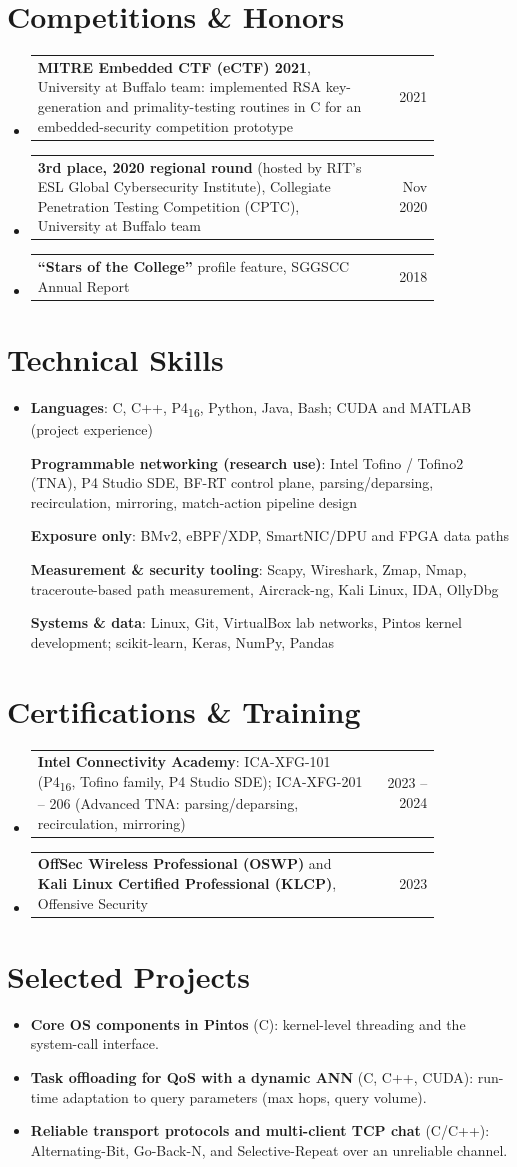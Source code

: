 \documentclass[letterpaper,10pt]{article}
\makeatletter
\newcommand{\cvsection}[2][5]{\Needspace{#1\baselineskip}\section{#2}}
\newcommand{\entryline}[2]{%
  \item\begin{tabular*}{\linewidth}{@{}p{0.84\linewidth}@{\extracolsep{\fill}}r@{}}
    \leavevmode #1 & \small #2\\
  \end{tabular*}\vspace{-3pt}}
\newenvironment{entries}{\begin{itemize}[leftmargin=0pt,label={},itemsep=2pt,topsep=0pt,parsep=0pt]}{\end{itemize}}
\newcommand{\skill}[2]{\textbf{#1}: #2\par\vspace{1.5pt}}
\makeatother
\begin{document}
\cvsection[6]{Competitions \& Honors}
\begin{entries}
  \entryline{\textbf{MITRE Embedded CTF (eCTF) 2021}, University at Buffalo team: implemented RSA key-generation and primality-testing
    routines in C for an embedded-security competition prototype}{2021}
  \entryline{\textbf{3rd place, 2020 regional round} (hosted by RIT's ESL Global Cybersecurity Institute), Collegiate Penetration
    Testing Competition (CPTC), University at Buffalo team}{Nov 2020}
  \entryline{\textbf{``Stars of the College''} profile feature, SGGSCC Annual Report}{2018}
\end{entries}

\cvsection[7]{Technical Skills}
\begin{itemize}[leftmargin=0pt,label={},topsep=1pt,itemsep=0pt]\small
\item\leavevmode
\skill{Languages}{C, C++, P4\textsubscript{16}, Python, Java, Bash; CUDA and MATLAB (project experience)}
\skill{Programmable networking (research use)}{Intel Tofino / Tofino2 (TNA), P4 Studio SDE, BF-RT control plane, parsing/deparsing,
  recirculation, mirroring, match-action pipeline design}
\skill{Exposure only}{BMv2, eBPF/XDP, SmartNIC/DPU and FPGA data paths}
\skill{Measurement \& security tooling}{Scapy, Wireshark, Zmap, Nmap, traceroute-based path measurement, Aircrack-ng, Kali Linux, IDA, OllyDbg}
\skill{Systems \& data}{Linux, Git, VirtualBox lab networks, Pintos kernel development; scikit-learn, Keras, NumPy, Pandas}
\end{itemize}
\vspace{-6pt}

\cvsection[5]{Certifications \& Training}
\begin{entries}
  \entryline{\textbf{Intel Connectivity Academy}: ICA-XFG-101 (P4\textsubscript{16}, Tofino family, P4 Studio SDE);
    ICA-XFG-201 -- 206 (Advanced TNA: parsing/deparsing, recirculation, mirroring)}{2023 -- 2024}
  \entryline{\textbf{OffSec Wireless Professional (OSWP)} and \textbf{Kali Linux Certified Professional (KLCP)}, Offensive Security}{2023}
\end{entries}

\cvsection[5]{Selected Projects}
\begin{itemize}[leftmargin=0pt,label={},topsep=0pt,itemsep=1pt]\small
  \item \textbf{Core OS components in Pintos} (C): kernel-level threading and the system-call interface.
  \item \textbf{Task offloading for QoS with a dynamic ANN} (C, C++, CUDA): run-time adaptation to query parameters (max hops, query volume).
  \item \textbf{Reliable transport protocols and multi-client TCP chat} (C/C++): Alternating-Bit, Go-Back-N, and Selective-Repeat over an unreliable channel.
\end{itemize}
\end{document}
